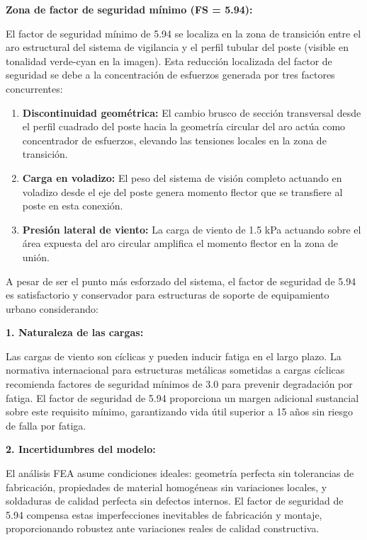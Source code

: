 \documentclass[12pt,a4paper,oneside]{report}
\begin{document}
\textbf{Zona de factor de seguridad mínimo (FS = 5.94):}

El factor de seguridad mínimo de 5.94 se localiza en la zona de transición entre el aro estructural del sistema de vigilancia y el perfil tubular del poste (visible en tonalidad verde-cyan en la imagen). Esta reducción localizada del factor de seguridad se debe a la concentración de esfuerzos generada por tres factores concurrentes:

\begin{enumerate}
\def\labelenumi{\arabic{enumi}.}
\item
  \textbf{Discontinuidad geométrica:} El cambio brusco de sección transversal desde el perfil cuadrado del poste hacia la geometría circular del aro actúa como concentrador de esfuerzos, elevando las tensiones locales en la zona de transición.
\item
  \textbf{Carga en voladizo:} El peso del sistema de visión completo actuando en voladizo desde el eje del poste genera momento flector que se transfiere al poste en esta conexión.
\item
  \textbf{Presión lateral de viento:} La carga de viento de 1.5 kPa actuando sobre el área expuesta del aro circular amplifica el momento flector en la zona de unión.
\end{enumerate}

A pesar de ser el punto más esforzado del sistema, el factor de seguridad de 5.94 es satisfactorio y conservador para estructuras de soporte de equipamiento urbano considerando:

\textbf{1. Naturaleza de las cargas:}

Las cargas de viento son cíclicas y pueden inducir fatiga en el largo plazo. La normativa internacional para estructuras metálicas sometidas a cargas cíclicas recomienda factores de seguridad mínimos de 3.0 para prevenir degradación por fatiga. El factor de seguridad de 5.94 proporciona un margen adicional sustancial sobre este requisito mínimo, garantizando vida útil superior a 15 años sin riesgo de falla por fatiga.

\textbf{2. Incertidumbres del modelo:}

El análisis FEA asume condiciones ideales: geometría perfecta sin tolerancias de fabricación, propiedades de material homogéneas sin variaciones locales, y soldaduras de calidad perfecta sin defectos internos. El factor de seguridad de 5.94 compensa estas imperfecciones inevitables de fabricación y montaje, proporcionando robustez ante variaciones reales de calidad constructiva.
\end{document}
